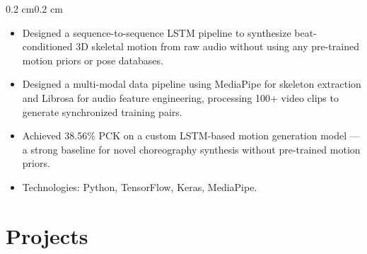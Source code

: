 \documentclass[10pt, a4paper]{article}
\newenvironment{highlights}{
    \begin{itemize}[
        topsep=0.10 cm,
        parsep=0.10 cm,
        partopsep=0pt,
        itemsep=0pt,
        leftmargin=0.4 cm + 10pt
    ]
}{\end{itemize}}
\newenvironment{onecolentry}{
    \begin{adjustwidth}{0.2 cm}{0.2 cm}
}{\end{adjustwidth}}
\begin{document}
    \vspace{0.10 cm}
    \begin{onecolentry}
        \begin{highlights}
\item Designed a sequence-to-sequence LSTM pipeline to synthesize beat-conditioned 3D skeletal motion from raw audio without using any pre-trained motion priors or pose databases.
\item Designed a multi-modal data pipeline using MediaPipe for skeleton extraction and Librosa for audio feature engineering, processing 100+ video clips to generate synchronized training pairs.
\item Achieved 38.56\% PCK on a custom LSTM-based motion generation model — a strong baseline for novel choreography synthesis without pre-trained motion priors.
   \item Technologies: Python, TensorFlow, Keras, MediaPipe.
        \end{highlights}
    \end{onecolentry}

\section{Projects}

\vspace{0.15 cm}
\end{document}
